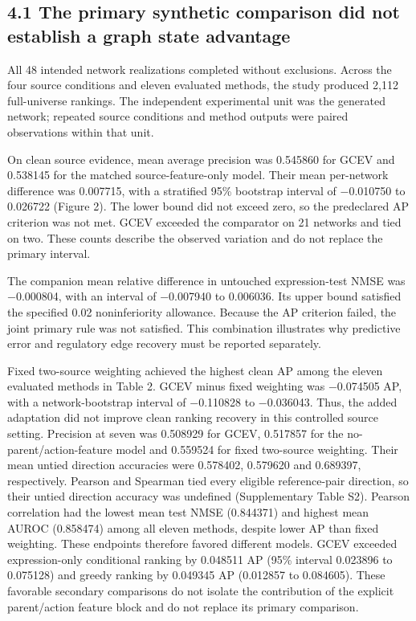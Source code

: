 \documentclass[
  11pt,
]{article}
\begin{document}
\subsection{4.1 The primary synthetic comparison did not establish a
graph state
advantage}\label{the-primary-synthetic-comparison-did-not-establish-a-graph-state-advantage}

All 48 intended network realizations completed without exclusions.
Across the four source conditions and eleven evaluated methods, the
study produced 2,112 full-universe rankings. The independent
experimental unit was the generated network; repeated source conditions
and method outputs were paired observations within that unit.

On clean source evidence, mean average precision was 0.545860 for GCEV
and 0.538145 for the matched source-feature-only model. Their mean
per-network difference was 0.007715, with a stratified 95\% bootstrap
interval of −0.010750 to 0.026722 (Figure 2). The lower bound did not
exceed zero, so the predeclared AP criterion was not met. GCEV exceeded
the comparator on 21 networks and tied on two. These counts describe the
observed variation and do not replace the primary interval.

The companion mean relative difference in untouched expression-test NMSE
was −0.000804, with an interval of −0.007940 to 0.006036. Its upper
bound satisfied the specified 0.02 noninferiority allowance. Because the
AP criterion failed, the joint primary rule was not satisfied. This
combination illustrates why predictive error and regulatory edge
recovery must be reported separately.

Fixed two-source weighting achieved the highest clean AP among the
eleven evaluated methods in Table 2. GCEV minus fixed weighting was
−0.074505 AP, with a network-bootstrap interval of −0.110828 to
−0.036043. Thus, the added adaptation did not improve clean ranking
recovery in this controlled source setting. Precision at seven was
0.508929 for GCEV, 0.517857 for the no-parent/action-feature model and
0.559524 for fixed two-source weighting. Their mean untied direction
accuracies were 0.578402, 0.579620 and 0.689397, respectively. Pearson
and Spearman tied every eligible reference-pair direction, so their
untied direction accuracy was undefined (Supplementary Table S2).
Pearson correlation had the lowest mean test NMSE (0.844371) and highest
mean AUROC (0.858474) among all eleven methods, despite lower AP than
fixed weighting. These endpoints therefore favored different models.
GCEV exceeded expression-only conditional ranking by 0.048511 AP (95\%
interval 0.023896 to 0.075128) and greedy ranking by 0.049345 AP
(0.012857 to 0.084605). These favorable secondary comparisons do not
isolate the contribution of the explicit parent/action feature block and
do not replace its primary comparison.
\end{document}
